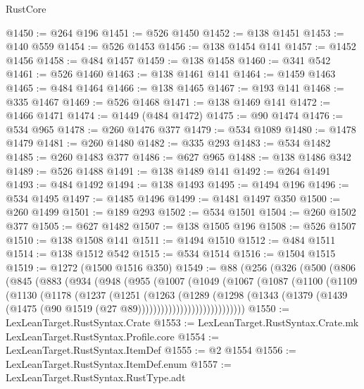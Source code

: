 \begin{lexlean}{RustCore}
\begin{coremodule}
@1450 := @264 @196
@1451 := @526 @1450
@1452 := @138 @1451
@1453 := @140 @559
@1454 := @526 @1453
@1456 := @138 @1454 @141
@1457 := @1452 @1456
@1458 := @484 @1457
@1459 := @138 @1458
@1460 := @341 @542
@1461 := @526 @1460
@1463 := @138 @1461 @141
@1464 := @1459 @1463
@1465 := @484 @1464
@1466 := @138 @1465
@1467 := @193 @141
@1468 := @335 @1467
@1469 := @526 @1468
@1471 := @138 @1469 @141
@1472 := @1466 @1471
@1474 := @1449 (@484 @1472)
@1475 := @90 @1474
@1476 := @534 @965
@1478 := @260 @1476 @377
@1479 := @534 @1089
@1480 := @1478 @1479
@1481 := @260 @1480
@1482 := @335 @293
@1483 := @534 @1482
@1485 := @260 @1483 @377
@1486 := @627 @965
@1488 := @138 @1486 @342
@1489 := @526 @1488
@1491 := @138 @1489 @141
@1492 := @264 @1491
@1493 := @484 @1492
@1494 := @138 @1493
@1495 := @1494 @196
@1496 := @534 @1495
@1497 := @1485 @1496
@1499 := @1481 @1497 @350
@1500 := @260 @1499
@1501 := @189 @293
@1502 := @534 @1501
@1504 := @260 @1502 @377
@1505 := @627 @1482
@1507 := @138 @1505 @196
@1508 := @526 @1507
@1510 := @138 @1508 @141
@1511 := @1494 @1510
@1512 := @484 @1511
@1514 := @138 @1512 @542
@1515 := @534 @1514
@1516 := @1504 @1515
@1519 := @1272 (@1500 @1516 @350)
@1549 := @88
    (@256
      (@326
        (@500
          (@806
            (@845
              (@883
                (@934
                  (@948
                    (@955
                      (@1007
                        (@1049
                          (@1067
                            (@1087
                              (@1100
                                (@1109
                                  (@1130
                                    (@1178
                                      (@1237
                                        (@1251
                                          (@1263
                                            (@1289
                                              (@1298
                                                (@1343
                                                  (@1379
                                                    (@1439
                                                      (@1475
                                                        (@90
                                                          @1519
                                                          (@27 @89))))))))))))))))))))))))))))
@1550 := LexLeanTarget.RustSyntax.Crate
@1553 := LexLeanTarget.RustSyntax.Crate.mk LexLeanTarget.RustSyntax.Profile.core
@1554 := LexLeanTarget.RustSyntax.ItemDef
@1555 := @2 @1554
@1556 := LexLeanTarget.RustSyntax.ItemDef.enum
@1557 := LexLeanTarget.RustSyntax.RustType.adt

\end{coremodule}
\end{lexlean}
